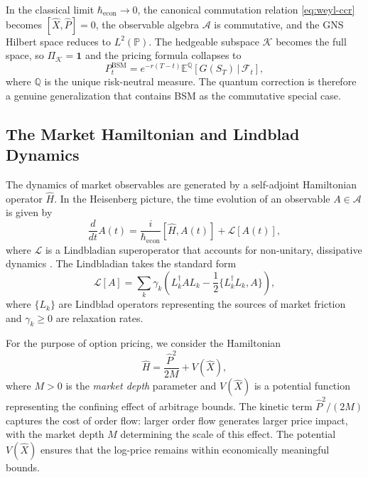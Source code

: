 \begin{remark}\label{rem:bsm-limit}
In the classical limit $\hbar_{\mathrm{econ}} \to 0$, the canonical commutation
relation \eqref{eq:weyl-ccr} becomes $[\hat{X}, \hat{P}] = 0$, the observable
algebra $\mathcal{A}$ is commutative, and the GNS Hilbert space reduces to
$L^2(\mathbb{P})$. The hedgeable subspace $\mathcal{K}$ becomes the full space, so
$\Pi_{\mathcal{K}} = \mathbf{1}$ and the pricing formula collapses to
\begin{equation*}
    P_t^{\mathrm{BSM}} = e^{-r(T-t)} \mathbb{E}^{\mathbb{Q}}[G(S_T) \,|\, \mathcal{F}_t],
\end{equation*}
where $\mathbb{Q}$ is the unique risk-neutral measure. The quantum correction is
therefore a genuine generalization that contains BSM as the commutative special
case.
\end{remark}

\subsection{The Market Hamiltonian and Lindblad Dynamics}

The dynamics of market observables are generated by a self-adjoint Hamiltonian
operator $\hat{H}$. In the Heisenberg picture, the time evolution of an observable
$A \in \mathcal{A}$ is given by
\begin{equation*}
    \frac{d}{dt} A(t) = \frac{i}{\hbar_{\mathrm{econ}}} [\hat{H}, A(t)]
    + \mathcal{L}[A(t)],
\end{equation*}
where $\mathcal{L}$ is a Lindbladian superoperator that accounts for non-unitary,
dissipative dynamics \citep{lindblad1976generators,gorini1976completely}. The
Lindbladian takes the standard form
\begin{equation*}
    \mathcal{L}[A] = \sum_k \gamma_k
    \left( L_k^\dagger A L_k - \frac{1}{2} \{L_k^\dagger L_k, A\} \right),
\end{equation*}
where $\{L_k\}$ are Lindblad operators representing the sources of market friction
and $\gamma_k \geq 0$ are relaxation rates.

For the purpose of option pricing, we consider the Hamiltonian
\begin{equation}\label{eq:hamiltonian}
    \hat{H} = \frac{\hat{P}^2}{2M} + V(\hat{X}),
\end{equation}
where $M > 0$ is the \emph{market depth} parameter and $V(\hat{X})$ is a potential
function representing the confining effect of arbitrage bounds. The kinetic term
$\hat{P}^2/(2M)$ captures the cost of order flow: larger order flow generates larger
price impact, with the market depth $M$ determining the scale of this effect. The
potential $V(\hat{X})$ ensures that the log-price remains within economically
meaningful bounds.

